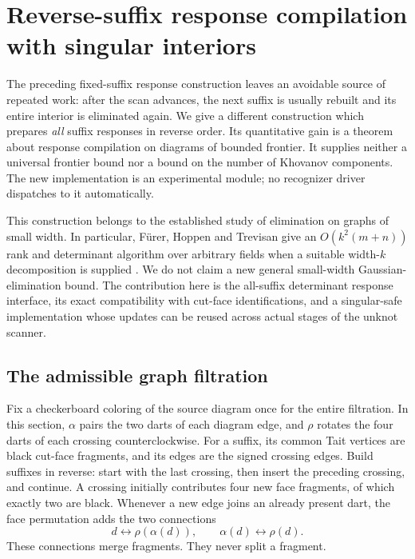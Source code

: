 \section{Reverse-suffix response compilation with singular interiors}
\label{sec:streaming-response}

The preceding fixed-suffix response construction leaves an avoidable source
of repeated work: after the scan advances, the next suffix is usually rebuilt
and its entire interior is eliminated again.  We give a different construction
which prepares \emph{all} suffix responses in reverse order.  Its quantitative
gain is a theorem about response compilation on diagrams of bounded frontier.
It supplies neither a universal frontier bound nor a bound on the number of
Khovanov components.  The new implementation is an experimental module; no
recognizer driver dispatches to it automatically.

This construction belongs to the established study of elimination on
graphs of small width.  In particular, F\"urer, Hoppen and Trevisan
give an $O(k^2(m+n))$ rank and determinant algorithm over arbitrary
fields when a suitable width-$k$ decomposition is supplied
\cite{furer-hoppen-trevisan}.  We do not claim a new general
small-width Gaussian-elimination bound.  The contribution here is the
all-suffix determinant response interface, its exact compatibility with
cut-face identifications, and a singular-safe implementation whose
updates can be reused across actual stages of the unknot scanner.

\subsection{The admissible graph filtration}

Fix a checkerboard coloring of the source diagram once for the entire
filtration. In this section, $\alpha$ pairs the two darts of each diagram
edge, and $\rho$ rotates the four darts of each crossing counterclockwise.
For a suffix, its common Tait vertices are black cut-face
fragments, and its edges are the signed crossing edges.  Build suffixes in
reverse: start with the last crossing, then insert the preceding crossing,
and continue.  A crossing initially contributes four new face fragments,
of which exactly two are black.  Whenever a new edge joins an already
present dart, the face permutation adds the two connections
\[
 d\longleftrightarrow\rho(\alpha(d)),\qquad
 \alpha(d)\longleftrightarrow\rho(d).
\]
These connections merge fragments.  They never split a fragment.

